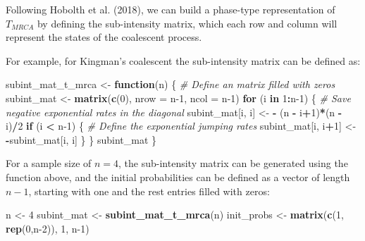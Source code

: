 \documentclass[]{article}
\newenvironment{Shaded}{\begin{snugshade}}{\end{snugshade}}
\newcommand{\CommentTok}[1]{\textcolor[rgb]{0.56,0.35,0.01}{\textit{#1}}}
\newcommand{\ControlFlowTok}[1]{\textcolor[rgb]{0.13,0.29,0.53}{\textbf{#1}}}
\newcommand{\DataTypeTok}[1]{\textcolor[rgb]{0.13,0.29,0.53}{#1}}
\newcommand{\DecValTok}[1]{\textcolor[rgb]{0.00,0.00,0.81}{#1}}
\newcommand{\KeywordTok}[1]{\textcolor[rgb]{0.13,0.29,0.53}{\textbf{#1}}}
\newcommand{\NormalTok}[1]{#1}
\newcommand{\OperatorTok}[1]{\textcolor[rgb]{0.81,0.36,0.00}{\textbf{#1}}}
\newcommand{\StringTok}[1]{\textcolor[rgb]{0.31,0.60,0.02}{#1}}
\begin{document}
Following Hobolth et al. (2018), we can build a phase-type
representation of \(T_{MRCA}\) by defining the sub-intensity matrix,
which each row and column will represent the states of the coalescent
process.

For example, for Kingman's coalescent the sub-intensity matrix can be
defined as:

\begin{Shaded}
\begin{Highlighting}[]

\NormalTok{subint_mat_t_mrca <-}\StringTok{ }\ControlFlowTok{function}\NormalTok{(n) \{}
  \CommentTok{# Define an matrix filled with zeros}
\NormalTok{  subint_mat <-}\StringTok{ }\KeywordTok{matrix}\NormalTok{(}\KeywordTok{c}\NormalTok{(}\DecValTok{0}\NormalTok{), }\DataTypeTok{nrow =}\NormalTok{ n}\DecValTok{-1}\NormalTok{, }\DataTypeTok{ncol =}\NormalTok{ n}\DecValTok{-1}\NormalTok{)}
  \ControlFlowTok{for}\NormalTok{ (i }\ControlFlowTok{in} \DecValTok{1}\OperatorTok{:}\NormalTok{n}\DecValTok{-1}\NormalTok{) \{}
    \CommentTok{# Save negative exponential rates in the diagonal}
\NormalTok{    subint_mat[i, i] <-}\StringTok{ }\OperatorTok{-}\StringTok{ }\NormalTok{(n }\OperatorTok{-}\StringTok{ }\NormalTok{i}\OperatorTok{+}\DecValTok{1}\NormalTok{)}\OperatorTok{*}\NormalTok{(n }\OperatorTok{-}\StringTok{ }\NormalTok{i)}\OperatorTok{/}\DecValTok{2}
    \ControlFlowTok{if}\NormalTok{ (i }\OperatorTok{<}\StringTok{ }\NormalTok{n}\DecValTok{-1}\NormalTok{) \{}
      \CommentTok{# Define the exponential jumping rates}
\NormalTok{      subint_mat[i, i}\OperatorTok{+}\DecValTok{1}\NormalTok{] <-}\StringTok{ }\OperatorTok{-}\NormalTok{subint_mat[i, i]}
\NormalTok{    \}}
\NormalTok{  \}}
\NormalTok{  subint_mat}
\NormalTok{\}}
\end{Highlighting}
\end{Shaded}

For a sample size of \(n=4\), the sub-intensity matrix can be generated
using the function above, and the initial probabilities can be defined
as a vector of length \(n-1\), starting with one and the rest entries
filled with zeros:

\begin{Shaded}
\begin{Highlighting}[]

\NormalTok{n <-}\StringTok{ }\DecValTok{4}
\NormalTok{subint_mat <-}\StringTok{ }\KeywordTok{subint_mat_t_mrca}\NormalTok{(n)}
\NormalTok{init_probs <-}\StringTok{ }\KeywordTok{matrix}\NormalTok{(}\KeywordTok{c}\NormalTok{(}\DecValTok{1}\NormalTok{, }\KeywordTok{rep}\NormalTok{(}\DecValTok{0}\NormalTok{,n}\DecValTok{-2}\NormalTok{)), }\DecValTok{1}\NormalTok{, n}\DecValTok{-1}\NormalTok{)}
\end{Highlighting}
\end{Shaded}
\end{document}
